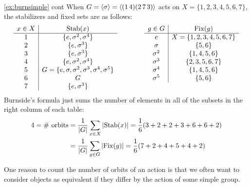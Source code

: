 \begin{example*}{\ref{ex:burnsimple} cont}{}
When $G=\left\langle \sigma\right\rangle=\left\langle (1\,4)(2\,7\,3)\right\rangle$ acts on $X=\{1,2,3,4,5,6,7\}$, the stabilizers and fixed sets are as follows:
	\[\begin{array}{c|c}
	x\in X&\Stab(x)\\\hline
	1&\{e,\sigma^2,\sigma^4\}\\
	2&\{e,\sigma^3\}\\
	3&\{e,\sigma^3\}\\
	4&\{e,\sigma^2,\sigma^4\}\\
	5&G=\{e,\sigma,\sigma^2,\sigma^3,\sigma^4,\sigma^5\}\\
	6&G\\
	7&\{e,\sigma^3\}
	\end{array}\qquad\qquad\begin{array}{c|c}
	g\in G&\Fix(g)\\\hline
	e&X=\{1,2,3,4,5,6,7\}\\
	\sigma&\{5,6\}\\
	\sigma^2&\{1,4,5,6\}\\
	\sigma^3&\{2,3,5,6,7\}\\
	\sigma^4&\{1,4,5,6\}\\
	\sigma^5&\{5,6\}\\
	\multicolumn{2}{c}{}
	\end{array}\]
	Burnside's formula just sums the number of elements in all of the subsets in the right column of each table:
\begin{align*}
4=\text{\# orbits}&=\frac{1}{\left| G\right|}\sum_{x\in X}\left| \operatorname{Stab}(x)\right|=\frac{1}{6}(3+2+2+3+6+6+2)\\
&=\frac{1}{\left| G\right|}\sum_{g\in G}\left| \operatorname{Fix}(g)\right|=\frac{1}{6}(7+2+4+5+4+2)
\end{align*}
\end{example*}

\goodbreak

One reason to count the number of orbits of an action is that we often want to consider objects as equivalent if they differ by the action of some simple group.

